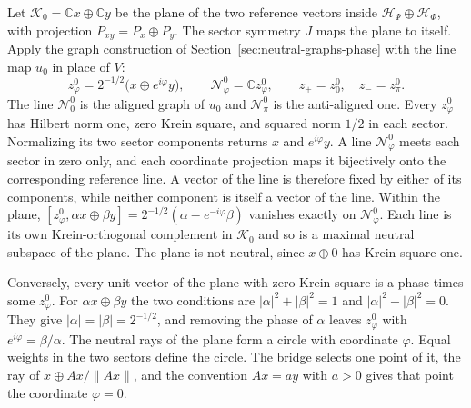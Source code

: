 \documentclass[11pt]{article}
\theoremstyle{definition}
\newcommand{\C}{\mathbb C}
\begin{document}
Let $\mathcal K_0=\C x\oplus\C y$ be the plane of the two reference vectors inside $\mathcal H_\Psi\oplus\mathcal H_\Phi$, with projection $P_{xy}=P_x\oplus P_y$. The sector symmetry $J$ maps the plane to itself. Apply the graph construction of Section~\ref{sec:neutral-graphs-phase} with the line map $u_0$ in place of $V$:
\begin{equation}
 z^0_\varphi=2^{-1/2}\bigl(x\oplus e^{i\varphi}y\bigr),\qquad
 \mathcal N^0_\varphi=\C z^0_\varphi,\qquad z_+=z^0_0,\quad z_-=z^0_\pi .
 \label{eq:ground-plane-vectors}
\end{equation}
The line $\mathcal N^0_0$ is the aligned graph of $u_0$ and $\mathcal N^0_\pi$ is the anti-aligned one. Every $z^0_\varphi$ has Hilbert norm one, zero Krein square, and squared norm $1/2$ in each sector. Normalizing its two sector components returns $x$ and $e^{i\varphi}y$. A line $\mathcal N^0_\varphi$ meets each sector in zero only, and each coordinate projection maps it bijectively onto the corresponding reference line. A vector of the line is therefore fixed by either of its components, while neither component is itself a vector of the line. Within the plane, $[z^0_\varphi,\alpha x\oplus\beta y]=2^{-1/2}(\alpha-e^{-i\varphi}\beta)$ vanishes exactly on $\mathcal N^0_\varphi$. Each line is its own Krein-orthogonal complement in $\mathcal K_0$ and so is a maximal neutral subspace of the plane. The plane is not neutral, since $x\oplus0$ has Krein square one.

Conversely, every unit vector of the plane with zero Krein square is a phase times some $z^0_\varphi$. For $\alpha x\oplus\beta y$ the two conditions are $|\alpha|^2+|\beta|^2=1$ and $|\alpha|^2-|\beta|^2=0$. They give $|\alpha|=|\beta|=2^{-1/2}$, and removing the phase of $\alpha$ leaves $z^0_\varphi$ with $e^{i\varphi}=\beta/\alpha$. The neutral rays of the plane form a circle with coordinate $\varphi$. Equal weights in the two sectors define the circle. The bridge selects one point of it, the ray of $x\oplus Ax/\|Ax\|$, and the convention $Ax=ay$ with $a>0$ gives that point the coordinate $\varphi=0$.
\end{document}
